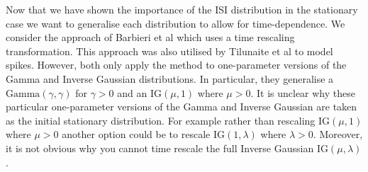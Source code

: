 \documentclass[oneside, 12 pt]{book}
\begin{document}
\hfill





Now that we have shown the importance of the ISI distribution in the stationary case we want to generalise each distribution to allow for time-dependence. We consider the approach of Barbieri et al \cite{Barbieri_2001} which uses a time rescaling transformation. This approach was also utilised by Tilunaite et al \cite{AGNE:1} to model  spikes. However, both only apply the method to one-parameter versions of the Gamma and Inverse Gaussian distributions. In particular, they generalise a $\mathrm{Gamma}(\gamma, \gamma)$ for $\gamma > 0$ and an $\mathrm{IG}(\mu, 1)$ where $\mu > 0$. It is unclear why these particular one-parameter versions of the Gamma and Inverse Gaussian are taken as the initial stationary distribution. For example rather than rescaling $\mathrm{IG}(\mu, 1)$ where $\mu > 0$ another option could be to rescale $\mathrm{IG}(1, \lambda)$ where $\lambda >0$. Moreover, it is not obvious why you cannot time rescale the full Inverse Gaussian $\mathrm{IG}(\mu, \lambda)$.

\end{document}
